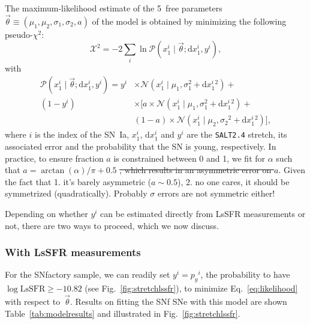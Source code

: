 \documentclass[]{aa} %
\newcommand{\yc}[1]{{\textcolor{BrickRed}{#1}}}
\newcommand{\prob}[2]{\mathcal{P}\left( #1 \mid #2\right)}
\begin{document}
The maximum-likelihood estimate of the 5~free parameters
$\vec{\theta}\equiv({\mu_1,\mu_2,\sigma_1,\sigma_2,a})$ of the model is obtained by
minimizing the \yc{following} pseudo-$\chi^2$: %
\begin{equation}
    \label{eq:likelihood}
    \mathcal{X}^2 = -2 \sum_i \ln \prob{x^{i}_{1}}{\vec{\theta};
    \mathrm{d}x^{i}_{1}, y^i},
\end{equation}
with
\begin{align}
    \label{eq:likelihoodsnf}
    \prob{x^{i}_{1}}{\vec{\theta}; \mathrm{d}x^{i}_{1}, y^i} =
    y^i &\times \mathcal{N}\left(x^{i}_{1} \mid \mu_1, \sigma_{1}^{2}+\mathrm{d}x^{i}_{1}{}^{2}\right) + {} \nonumber\\
        (1-y^i) &\times \bigg[
        a \times \mathcal{N}\left(x^{i}_{1} \mid \mu_1,
        \sigma_{1}^{2}+\mathrm{d}x^{i}_{1}{}^{2}\right) + {} \nonumber\\
     &(1-a) \times \mathcal{N}\left(x^{i}_{1} \mid \mu_2,
     \sigma_2{}^{2}+\mathrm{d}x^{i}_{1}{}^{2}\right) \bigg],
\end{align}
where $i$ is the index of the SN~Ia, $x^{i}_{1}$, $\mathrm{d}x^{i}_{1}$ and
$y^i$ are the \textsc{\texttt{SALT2.4}} stretch, its associated error and the
probability that the SN is young, respectively.  In practice, to ensure fraction
$a$ is constrained between 0 and 1, we fit for $\alpha$ such that
$a=\arctan(\alpha)/\pi+0.5$ \yc{\sout{, which results in an asymmetric error on $a$}}. \yc{Given the fact that 1. it's barely asymmetric ($a\sim 0.5$), 2. no one cares, it should be symmetrized (quadratically). Probably $\sigma$ errors are not symmetric either!}

Depending on whether $y^i$ can be estimated directly from LsSFR measurements or
not, there are two ways to proceed, which we now discuss.

\subsubsection{With LsSFR measurements}\label{sec:modelpy}

For the SNfactory sample, we can readily set $y^i = p_y{}^i$, the probability to
have $\log \mathrm{LsSFR} \geq -10.82$ (see Fig.~\ref{fig:stretchlssfr}), to
minimize Eq.~\ref{eq:likelihood} with respect to~$\vec{\theta}$.  Results on fitting
the SNf SNe with this model are shown Table~\ref{tab:modelresults} and
illustrated in Fig.~\ref{fig:stretchlssfr}.
\end{document}
